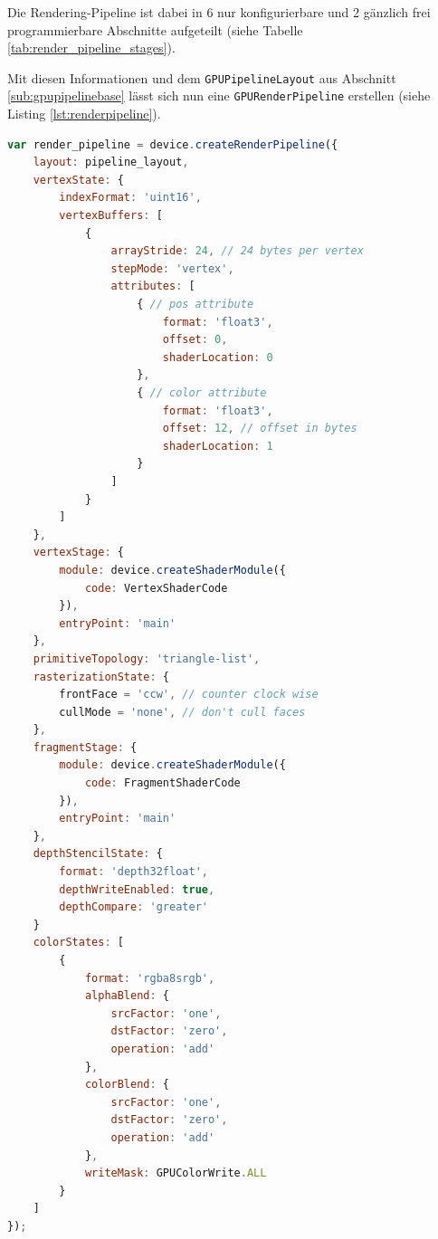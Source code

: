 \documentclass[oneside]{ausarbeitung}
\newcommand*{\quotize}[1]{\glqq #1\grqq}
\begin{document}
Die Rendering-Pipeline ist dabei in 6 nur konfigurierbare und 2 gänzlich frei programmierbare Abschnitte aufgeteilt (siehe Tabelle \ref{tab:render_pipeline_stages}).

Mit diesen Informationen und dem \texttt{GPUPipelineLayout} aus Abschnitt \ref{sub:gpupipelinebase} lässt sich nun eine \texttt{GPURenderPipeline} erstellen (siehe Listing \ref{lst:renderpipeline}).

\begin{lstlisting}[language=JavaScript, label={lst:renderpipeline}, caption={Erstellen einer \quotize{Standard}-\texttt{GPURenderPipeline}}]
var render_pipeline = device.createRenderPipeline({
    layout: pipeline_layout,
    vertexState: {
        indexFormat: 'uint16',
        vertexBuffers: [
            {
                arrayStride: 24, // 24 bytes per vertex
                stepMode: 'vertex',
                attributes: [
                    { // pos attribute
                        format: 'float3',
                        offset: 0,
                        shaderLocation: 0
                    },
                    { // color attribute
                        format: 'float3',
                        offset: 12, // offset in bytes
                        shaderLocation: 1
                    }
                ]
            }
        ]
    },
    vertexStage: {
        module: device.createShaderModule({
            code: VertexShaderCode
        }),
        entryPoint: 'main'
    },
    primitiveTopology: 'triangle-list',
    rasterizationState: {
        frontFace = 'ccw', // counter clock wise
        cullMode = 'none', // don't cull faces
    },
    fragmentStage: {
        module: device.createShaderModule({
            code: FragmentShaderCode
        }),
        entryPoint: 'main'
    },
    depthStencilState: {
        format: 'depth32float',
        depthWriteEnabled: true,
        depthCompare: 'greater'
    }
    colorStates: [
        {
            format: 'rgba8srgb',
            alphaBlend: { 
                srcFactor: 'one', 
                dstFactor: 'zero', 
                operation: 'add'
            },
            colorBlend: { 
                srcFactor: 'one', 
                dstFactor: 'zero', 
                operation: 'add'
            },
            writeMask: GPUColorWrite.ALL
        }
    ]
});
\end{lstlisting}
\end{document}
